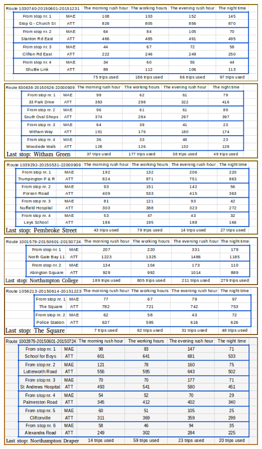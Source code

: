 \documentclass[12pt,a4paper,oneside,openright]{report}
\begin{document}
\includegraphics[width=\textwidth]{figs/table_of_1030740.png}
\includegraphics[width=\textwidth]{figs/table_of_830638.png}
\includegraphics[width=\textwidth]{figs/table_of_1039292.png}
\includegraphics[width=\textwidth]{figs/table_of_1001579.png}
\includegraphics[width=\textwidth]{figs/table_of_1056213.png}
\includegraphics[width=\textwidth]{figs/table_of_1002879.png}
\end{document}

